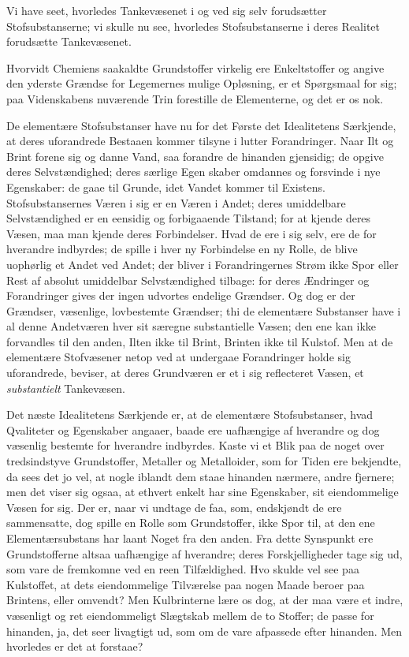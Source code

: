 \documentclass[12pt,a4paper]{book}
\begin{document}
Vi have seet, hvorledes Tankevæsenet i og ved sig selv forudsætter
Stofsubstanserne; vi skulle nu see, hvorledes Stofsubstanserne i deres
Realitet forudsætte Tankevæsenet.

Hvorvidt Chemiens saakaldte Grundstoffer virkelig ere Enkeltstoffer og
angive den yderste Grændse for Legemernes mulige Opløsning, er et
Spørgsmaal for sig; paa Videnskabens nuværende Trin forestille de
Elementerne, og det er os nok.

De elementære Stofsubstanser have nu for det Første det Idealitetens
Særkjende, at deres uforandrede Bestaaen kommer tilsyne i lutter
Forandringer. Naar Ilt og Brint forene sig og danne Vand, saa forandre de
hinanden gjensidig; de opgive deres Selvstændighed; deres særlige Egen\-%
skaber omdannes og forsvinde i nye Egenskaber: de gaae til Grunde, idet
Vandet kommer til Existens. Stofsubstansernes Væren i sig er en Væren i
Andet; deres umiddelbare Selvstændighed er en eensidig og forbigaaende
Tilstand; for at kjende deres Væsen, maa man kjende deres Forbindelser.
Hvad de ere i sig selv, ere de for hverandre indbyrdes; de spille i hver
ny Forbindelse en ny Rolle, de blive uophørlig et Andet ved Andet; der
bliver i Forandringernes Strøm ikke Spor eller Rest af absolut umiddelbar
Selvstændighed tilbage: for deres Ændringer og Forandringer gives der
ingen udvortes endelige Grændser. Og dog er der Grændser, væsenlige,
lovbestemte Grændser; thi de elementære Substanser have i al denne
Andetværen hver sit særegne substantielle Væsen; den ene kan ikke
forvandles til den anden, Ilten ikke til Brint, Brinten ikke til Kulstof.
Men at de elementære Stofvæsener netop ved at undergaae Forandringer holde
sig uforandrede, beviser, at deres Grundværen er et i sig reflecteret
Væsen, et \emph{substantielt} Tankevæsen.

Det næste Idealitetens Særkjende er, at de elementære Stofsubstanser, hvad
Qvaliteter og Egenskaber angaaer, baade ere uafhængige af hverandre og dog
væsenlig bestemte for hverandre indbyrdes. Kaste vi et Blik paa de noget
over tredsindstyve Grundstoffer, Metaller og Metalloider, som for Tiden
ere bekjendte, da sees det jo vel, at nogle iblandt dem staae hinanden
nærmere, andre fjernere; men det viser sig ogsaa, at ethvert enkelt har
sine Egenskaber, sit eiendommelige Væsen for sig. Der er, naar vi undtage
de faa, som, endskjøndt de ere sammensatte, dog spille en Rolle som
Grundstoffer, ikke Spor til, at den ene Elementærsubstans har laant Noget
fra den anden. Fra dette Synspunkt ere Grundstofferne altsaa uafhængige af
hverandre; deres Forskjelligheder tage sig ud, som vare de fremkomne ved
en reen Tilfældighed. Hvo skulde vel see paa Kulstoffet, at dets
eiendommelige Tilværelse paa nogen Maade beroer paa
Brintens, eller omvendt? Men Kulbrinterne lære os dog, at der maa være et
indre, væsenligt og ret eiendommeligt Slægtskab mellem de to Stoffer; de
passe for hinanden, ja, det seer livagtigt ud, som om de vare afpassede
efter hinanden. Men hvorledes er det at forstaae?
\end{document}
